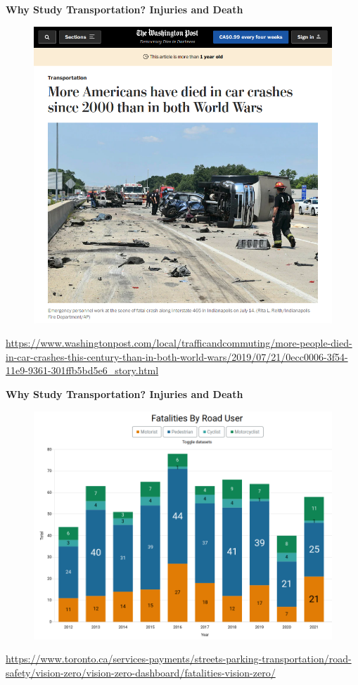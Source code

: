 \documentclass[aspectratio=169]{beamer}
\begin{document}
\begin{frame}
	\textbf{Why Study Transportation? Injuries and Death}
	\begin{figure}
		\centering
		\includegraphics[width=0.5\linewidth]{images/wash_post_deaths.png}
	\end{figure}
	\tiny\url{https://www.washingtonpost.com/local/trafficandcommuting/more-people-died-in-car-crashes-this-century-than-in-both-world-wars/2019/07/21/0ecc0006-3f54-11e9-9361-301ffb5bd5e6_story.html}
\end{frame}


\begin{frame}
	\textbf{Why Study Transportation? Injuries and Death}
	\begin{figure}
		\centering
		\includegraphics[width=0.7\linewidth]{images/vision_zero_deaths.png}
	\end{figure}
	\tiny\url{https://www.toronto.ca/services-payments/streets-parking-transportation/road-safety/vision-zero/vision-zero-dashboard/fatalities-vision-zero/}
\end{frame}
\end{document}
